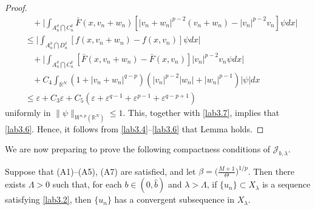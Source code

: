 \documentclass[reqno]{amsart}
\begin{document}
\begin{proof}
\begin{align*}
&\ \ \ \ +\Big|\int_{A^{\bar{\sigma}}_n\bigcap C^\delta_n} \bar{F}(x,v_n+w_n)[|v_n+w_n|^{p-2}(v_n+w_n)-|v_n|^{p-2}v_n]\psi dx\Big|   \\
&\leq\Big|\int_{A^{\bar{\sigma}}_n\bigcap D^\delta_n} [f(x,v_n+w_n)-f(x,v_n)]\psi dx\Big|   \\
&\ \ \ \ +\Big|\int_{A^{\bar{\sigma}}_n\bigcap C^\delta_n} [\bar{F}(x,v_n+w_n)-\bar{F}(x,v_n)]|v_n|^{p-2}v_n\psi dx\Big|   \\
&\ \ \ \ +C_4\int_{\mathbb{R}^N} (1+|v_n+w_n|^{q-p})(|v_n|^{p-2}|w_n|+|w_n|^{p-1})|\psi| dx   \\
&\leq \varepsilon+C_3\varepsilon+C_5(\varepsilon+\varepsilon^{q-1}+\varepsilon^{p-1}+\varepsilon^{q-p+1})
\end{align*}
uniformly in $\|\psi\|_{W^{s,p}(\mathbb{R}^N)}\leq1$. 
This, together with \eqref{lab3.7}, implies that \eqref{lab3.6}.  Hence, it follows 
from \eqref{lab3.4}--\eqref{lab3.6} that Lemma holds.
\end{proof}

We are now preparing to prove the following compactness conditions of 
$\mathcal{J}_{b,\lambda}$.

\begin{lemma}\label{L3.7}
Suppose that {\rm (A1)--(A5), (A7)} are satisfied, and let
$\beta=\big(\frac{M+1}{\Theta}\big)^{1/p}$. Then there exists $\Lambda>0$
such that, for each $b\in(0, \widehat{b})$ and $\lambda>\Lambda$, 
if $\{u_n\}\subset X_\lambda$ is a sequence satisfying \eqref{lab3.2}, 
then $\{u_n\}$ has a convergent subsequence in $X_\lambda$.
\end{lemma}
\end{document}
